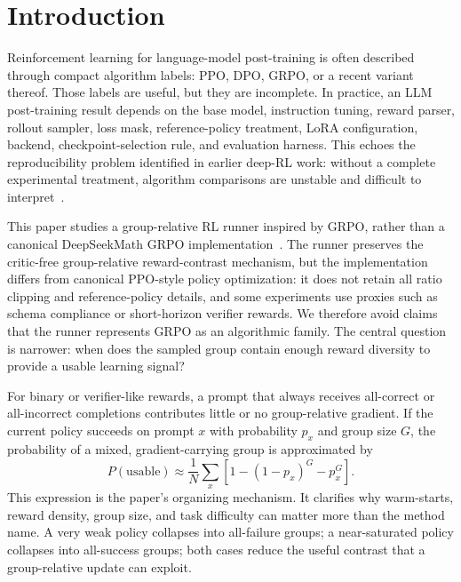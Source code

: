 \documentclass[runningheads,a4paper]{llncs}
\begin{document}
\section{Introduction}
\label{sec:introduction}

Reinforcement learning for language-model post-training is often described
through compact algorithm labels: PPO, DPO, GRPO, or a recent variant thereof.
Those labels are useful, but they are incomplete. In practice, an LLM
post-training result depends on the base model, instruction tuning, reward
parser, rollout sampler, loss mask, reference-policy treatment, LoRA
configuration, backend, checkpoint-selection rule, and evaluation harness.
This echoes the reproducibility problem identified in earlier deep-RL work:
without a complete experimental treatment, algorithm comparisons are unstable
and difficult to interpret~\cite{henderson2018deep,agarwal2021deep}.

This paper studies a group-relative RL runner inspired by GRPO, rather than a
canonical DeepSeekMath GRPO implementation~\cite{shao2024deepseekmath}. The
runner preserves the critic-free group-relative reward-contrast mechanism, but
the implementation differs from canonical PPO-style policy optimization: it
does not retain all ratio clipping and reference-policy details, and some
experiments use proxies such as schema compliance or short-horizon verifier
rewards. We therefore avoid claims that the runner represents GRPO as an
algorithmic family. The central question is narrower: when does the sampled
group contain enough reward diversity to provide a usable learning signal?

For binary or verifier-like rewards, a prompt that always receives all-correct
or all-incorrect completions contributes little or no group-relative gradient.
If the current policy succeeds on prompt $x$ with probability $p_x$ and group
size $G$, the probability of a mixed, gradient-carrying group is approximated by
\begin{equation}
P(\mathrm{usable}) \approx
\frac{1}{N}\sum_x \left[1-(1-p_x)^G-p_x^G\right].
\label{eq:mixed_group}
\end{equation}
This expression is the paper's organizing mechanism. It clarifies why
warm-starts, reward density, group size, and task difficulty can matter more
than the method name. A very weak policy collapses into all-failure groups; a
near-saturated policy collapses into all-success groups; both cases reduce the
useful contrast that a group-relative update can exploit.
\end{document}
